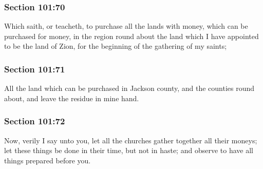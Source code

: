 	\subsubsection{Section 101:70} %
		\label{DC101-70}

		Which saith, or teacheth, to purchase all the lands with money, which can be purchased for money, in the region round about the land which I have appointed to be the land of Zion, for the beginning of the gathering of my saints;


	\subsubsection{Section 101:71} %
		\label{DC101-71}

		All the land which can be purchased in Jackson county, and the counties round about, and leave the residue in mine hand.


	\subsubsection{Section 101:72} %
		\label{DC101-72}

		Now, verily I say unto you, let all the churches gather together all their moneys; let these things be done in their time, but not in haste; and observe to have all things prepared before you.


